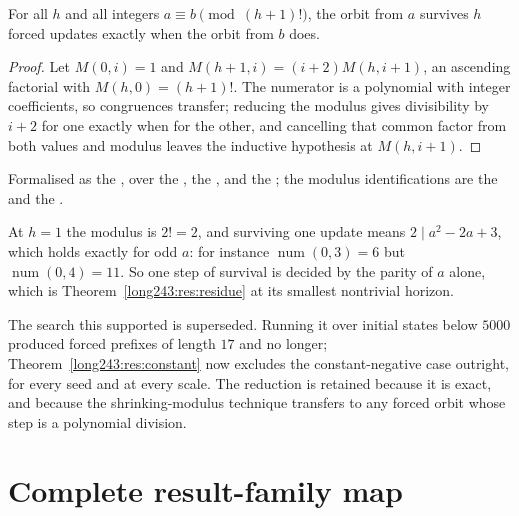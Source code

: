\documentclass[11pt]{article}
\newcommand{\fnum}{\operatorname{num}}
\begin{document}
\begin{theorem}\label{long243:res:residue}
For all $h$ and all integers $a\equiv b \pmod{(h+1)!}$, the orbit from $a$
survives $h$ forced updates exactly when the orbit from $b$ does.
\end{theorem}

\begin{proof}
Let $M(0,i)=1$ and $M(h+1,i)=(i+2)M(h,i+1)$, an ascending factorial with
$M(h,0)=(h+1)!$.  The numerator is a polynomial with integer coefficients, so
congruences transfer; reducing the modulus gives divisibility by $i+2$ for one
exactly when for the other, and cancelling that common factor from both values
and modulus leaves the inductive hypothesis at $M(h,i+1)$.
\end{proof}

\noindent Formalised as the
, over the
, the
, and the
; the modulus identifications are the
 and the
.

At $h=1$ the modulus is $2!=2$, and surviving one update means
$2\mid a^{2}-2a+3$, which holds exactly for odd $a$: for instance
$\fnum(0,3)=6$ but $\fnum(0,4)=11$.  So one step of survival is decided by the
parity of $a$ alone, which is Theorem~\ref{long243:res:residue} at its smallest
nontrivial horizon.

The search this supported is superseded.  Running it over initial states below
$5000$ produced forced prefixes of length $17$ and no longer;
Theorem~\ref{long243:res:constant} now excludes the
constant-negative case outright, for every seed and at every scale.  The
reduction is retained because it is exact, and because the shrinking-modulus
technique transfers to any forced orbit whose step is a polynomial division.
\clearpage
\section{Complete result-family map}\label{sec:erdos-243-complete-family-map}
\end{document}
